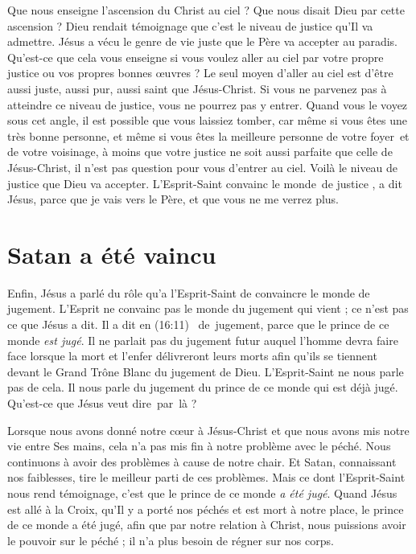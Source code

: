 Que nous enseigne l'ascension du Christ au ciel ?
 Que nous disait Dieu par cette ascension ?
 Dieu rendait témoignage que c'est le niveau de justice qu'Il va admettre.
 Jésus a vécu le genre de vie juste que le Père va accepter au paradis.
 Qu'est-ce que cela vous enseigne si vous voulez aller au ciel par votre propre
 justice ou vos propres bonnes œuvres ?
 Le seul moyen d'aller au ciel est d'être aussi juste, aussi pur,
 aussi saint que Jésus-Christ.
 Si vous ne parvenez pas à atteindre ce niveau de justice,
 vous ne pourrez pas y entrer. Quand vous le voyez sous cet angle,
 il est possible que vous laissiez tomber, car même si vous êtes une très bonne
 personne, et même si vous êtes la meilleure personne de votre foyer~et %
 de votre voisinage, à moins que votre justice ne soit aussi parfaite
 que celle de Jésus-Christ, il n'est pas question pour vous d'entrer au ciel.
 Voilà le niveau de justice que Dieu va accepter.
 \Og L'Esprit-Saint convainc le monde~de justice \Fg{}, a dit Jésus,
 \Og parce que je vais vers le Père, et que vous ne me verrez plus. \Fg{}


\section{Satan a \'et\'e vaincu}

Enfin, Jésus a parlé du rôle qu'a l'Esprit-Saint de convaincre le monde de jugement.
 L'Esprit ne convainc pas le monde du jugement qui vient ;
 ce n'est pas ce que Jésus a dit. Il a dit en (16:11)\frcolon{}
 \Og [...]~de~jugement, parce que le prince de ce monde \emph{est jugé}. \Fg{}
 Il ne parlait pas du jugement futur auquel l'homme devra faire face
 lorsque la mort et l'enfer délivreront leurs morts afin qu'ils se tiennent
 devant le Grand Trône Blanc du jugement de Dieu.
 L'Esprit-Saint ne nous parle pas de cela. Il nous parle du jugement
 du prince de ce monde qui est déjà jugé.
 Qu'est-ce que Jésus veut dire~par~là ?

Lorsque nous avons donné notre cœur à Jésus-Christ et que nous avons mis notre vie
 entre Ses mains, cela n'a pas mis fin à notre problème avec le péché.
 Nous continuons à avoir des problèmes à cause de notre chair.
 Et Satan, connaissant nos faiblesses,
 tire le meilleur parti de ces problèmes. Mais ce dont l'Esprit-Saint nous rend témoignage,
 c'est que le prince de ce monde \emph{a été jugé}.
 Quand Jésus est allé à la Croix, qu'Il y a porté nos péchés et est mort
 à notre place, le prince de ce monde a été jugé,
 afin que par notre relation à Christ, nous puissions avoir le pouvoir
 sur le péché ; il n'a plus besoin de régner sur nos corps.

